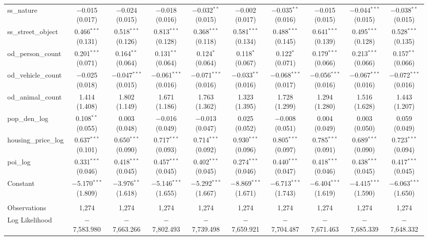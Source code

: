 \begin{table}[!htbp]
\begin{tabular}{@{\extracolsep{1pt}}lccccccccc}
  ss\_nature & $-$0.015 (0.017) & $-$0.024 (0.015) & $-$0.018 (0.016) & $-$0.032$^{**}$ (0.015) & $-$0.002 (0.017) & $-$0.035$^{**}$ (0.016) & $-$0.015 (0.015) & $-$0.044$^{***}$ (0.015) & $-$0.038$^{**}$ (0.015) \\ 
  ss\_street\_object & 0.466$^{***}$ (0.131) & 0.518$^{***}$ (0.126) & 0.813$^{***}$ (0.128) & 0.368$^{***}$ (0.118) & 0.581$^{***}$ (0.134) & 0.488$^{***}$ (0.145) & 0.641$^{***}$ (0.139) & 0.495$^{***}$ (0.128) & 0.528$^{***}$ (0.135) \\ 
  od\_person\_count & 0.201$^{***}$ (0.071) & 0.164$^{**}$ (0.064) & 0.131$^{**}$ (0.064) & 0.124$^{*}$ (0.064) & 0.118$^{*}$ (0.067) & 0.122$^{*}$ (0.071) & 0.179$^{***}$ (0.066) & 0.213$^{***}$ (0.066) & 0.157$^{**}$ (0.066) \\ 
  od\_vehicle\_count & $-$0.025 (0.018) & $-$0.047$^{***}$ (0.015) & $-$0.061$^{***}$ (0.016) & $-$0.071$^{***}$ (0.016) & $-$0.033$^{**}$ (0.016) & $-$0.068$^{***}$ (0.017) & $-$0.056$^{***}$ (0.016) & $-$0.067$^{***}$ (0.016) & $-$0.072$^{***}$ (0.016) \\ 
  od\_animal\_count & 1.414 (1.408) & 1.802 (1.149) & 1.671 (1.186) & 1.763 (1.362) & 1.323 (1.395) & 1.728 (1.299) & 1.294 (1.280) & 1.516 (1.628) & 1.443 (1.207) \\ 
  pop\_den\_log & 0.108$^{**}$ (0.055) & 0.003 (0.048) & $-$0.016 (0.049) & $-$0.013 (0.047) & 0.025 (0.052) & $-$0.008 (0.051) & 0.004 (0.049) & 0.003 (0.050) & 0.059 (0.049) \\ 
  housing\_price\_log & 0.637$^{***}$ (0.101) & 0.650$^{***}$ (0.090) & 0.717$^{***}$ (0.093) & 0.714$^{***}$ (0.092) & 0.930$^{***}$ (0.096) & 0.805$^{***}$ (0.097) & 0.785$^{***}$ (0.091) & 0.689$^{***}$ (0.090) & 0.723$^{***}$ (0.094) \\ 
  poi\_log & 0.331$^{***}$ (0.046) & 0.418$^{***}$ (0.045) & 0.457$^{***}$ (0.045) & 0.402$^{***}$ (0.045) & 0.274$^{***}$ (0.046) & 0.440$^{***}$ (0.047) & 0.418$^{***}$ (0.046) & 0.438$^{***}$ (0.045) & 0.417$^{***}$ (0.045) \\ 
  Constant & $-$5.170$^{***}$ (1.809) & $-$3.976$^{**}$ (1.618) & $-$5.146$^{***}$ (1.655) & $-$5.292$^{***}$ (1.667) & $-$8.869$^{***}$ (1.671) & $-$6.713$^{***}$ (1.743) & $-$6.404$^{***}$ (1.619) & $-$4.415$^{***}$ (1.590) & $-$6.063$^{***}$ (1.650) \\ 
 \hline \\[-1.8ex] 
Observations & 1,274 & 1,274 & 1,274 & 1,274 & 1,274 & 1,274 & 1,274 & 1,274 & 1,274 \\ 
Log Likelihood & $-$7,583.980 & $-$7,663.266 & $-$7,802.493 & $-$7,739.498 & $-$7,659.921 & $-$7,704.487 & $-$7,671.463 & $-$7,685.339 & $-$7,648.332 \\ 

\end{tabular}
\end{table}
